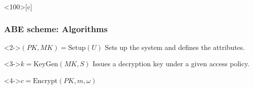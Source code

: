 \begin{frame}<100>[c]
    \frametitle{ABE scheme: Algorithms}
    \begin{minipage}[t]{0.49\textwidth}
        \begin{center}
        \end{center}
        \vspace{0.5cm}
        \begin{block}<2->{\centering $(PK, MK) = \text{Setup}(U)$}
            \centering
            Sets up the system and defines the attributes.
        \end{block}
        \vspace{0.5cm}
        \begin{block}<3->{\centering $k = \text{KeyGen}(MK, S)$}
            \centering
            Issues a decryption key under a given access policy.
        \end{block}
    \end{minipage}
    \begin{minipage}[t]{0.49\textwidth}
        \begin{center}
        \end{center}
        \vspace{0.5cm}
        \begin{block}<4->{\centering $c = \text{Encrypt}(PK, m, \omega)$}

\end{block}
\end{minipage}
\end{frame}
